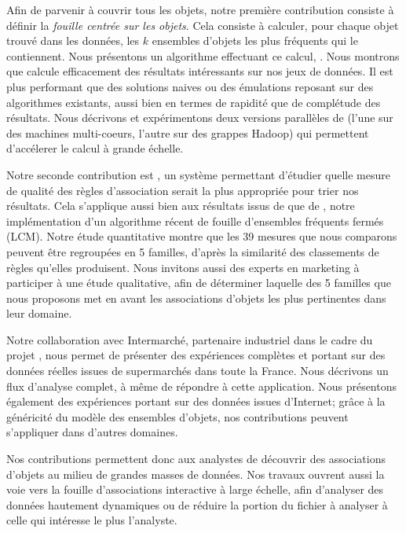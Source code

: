 Afin de parvenir \`a couvrir tous les objets,
notre premi\`ere contribution consiste à d\'efinir la {\em fouille centr\'ee sur les objets}.
Cela consiste \`a calculer, pour chaque objet trouv\'e dans les donn\'ees,
les $k$ ensembles d'objets les plus fr\'equents qui le contiennent.
Nous pr\'esentons un algorithme effectuant ce calcul, \toppi.
Nous montrons que \toppi calcule efficacement des r\'esultats int\'eressants sur nos jeux de donn\'ees.
Il est plus performant que des solutions naives ou des \'emulations reposant sur des algorithmes existants,
aussi bien en termes de rapidit\'e que de compl\'etude des r\'esultats.
Nous d\'ecrivons et exp\'erimentons deux versions parall\`eles de \toppi
(l'une sur des machines multi-coeurs,
l'autre sur des grappes Hadoop)
qui permettent d'acc\'elerer le calcul à grande \'echelle.

Notre seconde contribution est \capa,
un syst\`eme permettant d'\'etudier quelle mesure de qualit\'e des r\`egles d'association
serait la plus appropri\'ee pour trier nos r\'esultats.
Cela s'applique aussi bien aux r\'esultats issus de \toppi que de \jlcm,
notre impl\'ementation d'un algorithme r\'ecent de fouille d'ensembles fr\'equents ferm\'es (LCM).
Notre \'etude quantitative montre que les 39 mesures que nous comparons
peuvent \^etre regroup\'ees en 5 familles,
d'apr\`es la similarit\'e des classements de r\`egles qu'elles produisent.
Nous invitons aussi des experts en marketing \`a participer \`a une \'etude qualitative,
afin de d\'eterminer laquelle des 5 familles que nous proposons met en avant
les associations d'objets les plus pertinentes dans leur domaine.

Notre collaboration avec Intermarch\'e,
partenaire industriel dans le cadre du projet \datalyse,
nous permet de pr\'esenter des exp\'eriences compl\`etes et portant
sur des donn\'ees r\'eelles issues de supermarch\'es dans toute la France.
Nous d\'ecrivons un flux d'analyse complet, \`a m\^eme de r\'epondre \`a cette application.
Nous pr\'esentons également des exp\'eriences portant sur des donn\'ees issues d'Internet;
gr\^ace \`a la g\'en\'ericit\'e du mod\`ele des ensembles d'objets,
nos contributions peuvent s'appliquer dans d'autres domaines.

Nos contributions permettent donc aux analystes
de d\'ecouvrir des associations d'objets au milieu de grandes masses de donn\'ees.
Nos travaux ouvrent aussi la voie vers la fouille d'associations interactive \`a large \'echelle,
afin d'analyser des donn\'ees hautement dynamiques
ou de r\'eduire la portion du fichier \`a analyser \`a celle qui int\'eresse le plus l'analyste.





